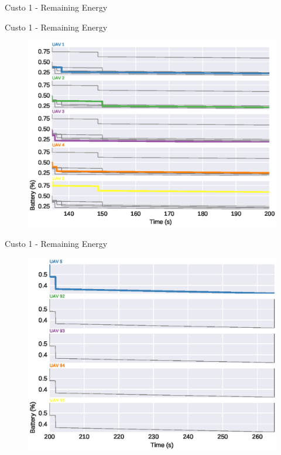\begin{frame}{Custo 1 - Remaining Energy}
                \end{frame}\begin{frame}{Custo 1 - Remaining Energy}
                    \begin{figure}[!htb]
                        \includegraphics[width=\textwidth]{custo_1/uav_remaining_energy_200.eps}
                    \end{figure}
                \end{frame}\begin{frame}{Custo 1 - Remaining Energy}
                    \begin{figure}[!htb]
                        \includegraphics[width=\textwidth]{custo_1/uav_remaining_energy_265.eps}

\end{figure}
\end{frame}
